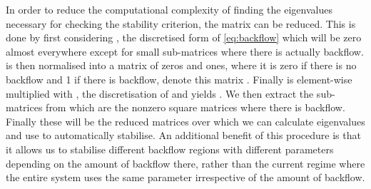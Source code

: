 In order to reduce the computational complexity of finding the eigenvalues necessary for checking the stability criterion, the matrix can be reduced. This is done by first considering , the discretised form of \eqref{eq:backflow} which will be zero almost everywhere except for small sub-matrices where there is actually backflow.  is then normalised into a matrix of zeros and ones, where it is zero if there is no backflow and 1 if there is backflow, denote this matrix . Finally  is element-wise multiplied with , the discretisation of  and yields . We then extract the sub-matrices from  which are the nonzero square matrices where there is backflow. Finally these will be the reduced matrices over which we can calculate eigenvalues and use to automatically stabilise. An additional benefit of this procedure is that it allows us to stabilise different backflow regions with different parameters depending on the amount of backflow there, rather than the current regime where the entire system uses the same parameter irrespective of the amount of backflow.

